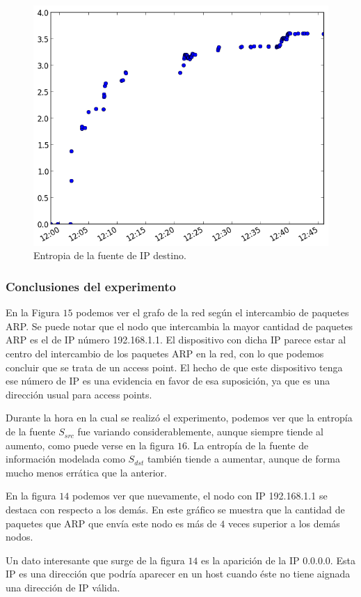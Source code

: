 \begin{figure}[H]
  \centering
	\includegraphics[scale=0.66]{../experimentacion-barbeiton/entropy_dst.png}
  \caption{Entropia de la fuente de IP destino.}
\end{figure}

\subsubsection{Conclusiones del experimento}
En la Figura $15$ podemos ver el grafo de la red según el intercambio de paquetes ARP. Se puede notar que el nodo que intercambia la mayor cantidad de paquetes ARP es el de IP número 192.168.1.1. El dispositivo con dicha IP parece estar al centro del intercambio de los paquetes ARP en la red, con lo que podemos concluir que se trata de un access point. El hecho de que este dispositivo tenga ese número de IP es una evidencia en favor de esa suposición, ya que es una dirección usual para access points.
\par Durante la hora en la cual se realizó el experimento, podemos ver que la entropía de la fuente $S_{src}$ fue variando considerablemente, aunque siempre tiende al aumento, como puede verse en la figura $16$. La entropía de la fuente de información modelada como $S_{dst}$ también tiende a aumentar, aunque de forma mucho menos errática que la anterior. 
\par En la figura $14$ podemos ver que nuevamente, el nodo con IP 192.168.1.1 se destaca con respecto a los demás. En este gráfico se muestra que la cantidad de paquetes que ARP que envía este nodo es más de $4$ veces superior a los demás nodos. 
\par Un dato interesante que surge de la figura $14$ es la aparición de la IP 0.0.0.0. Esta IP es una dirección que podría aparecer en un host cuando éste no tiene aignada una dirección de IP válida.

